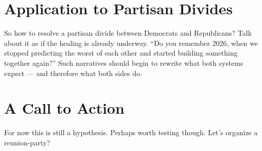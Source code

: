 \documentclass{article}
\begin{document}
\section*{Application to Partisan Divides}

So how to resolve a partisan divide between Democrats and Republicans? Talk about it as if the healing is already underway. ``Do you remember 2026, when we stopped predicting the worst of each other and started building something together again?'' Such narratives should begin to rewrite what both systems expect — and therefore what both sides do.

\section*{A Call to Action}

For now this is still a hypothesis. Perhaps worth testing though. Let's organize a reunion-party?
\end{document}
